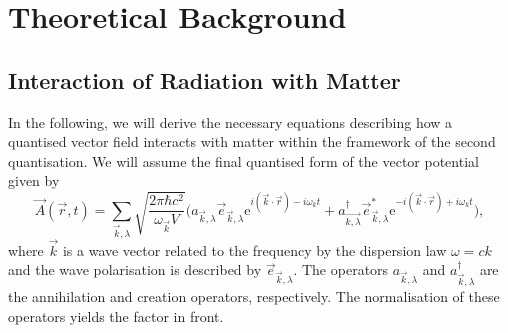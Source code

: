 \chapter{Theoretical Background}\label{sec:background}
\section{Interaction of Radiation with Matter}\label{RadMatter}
In the following, we will derive the necessary equations describing how a quantised vector field interacts with matter within the framework of the second quantisation. We will assume the final quantised form of the vector potential given by
\begin{equation} \label{quantised}
	\vec{A}(\vec{r},t) = \sum_{\vec{k},\lambda} \sqrt{\frac{2\pi\hbar c^2}{\omega_{\vec{k}} V}} \bigg(a_{\vec{k},\lambda}\vec{e}_{\vec{k},\lambda}\text{e}^{i(\vec{k}\cdot \vec{r})-i\omega_k t}+a_{\vec{k,\lambda}}^\dagger\vec{e}_{\vec{k},\lambda}^*\text{e}^{-i(\vec{k}\cdot \vec{r})+i\omega_k t}\bigg),
\end{equation}
where $\vec{k}$ is a wave vector related to the frequency by the dispersion law $\omega=ck$ and the wave polarisation is described by $\vec{e}_{\vec{k},\lambda}$. The operators $a_{\vec{k},\lambda}$ and $a_{\vec{k},\lambda}^\dagger$ are the annihilation and creation operators, respectively. The normalisation of these operators yields the factor in front. 

